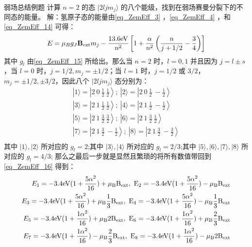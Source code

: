 \begin{example}{弱场总结例题}
计算 $n=2$ 的态 $|2ljm_j\rangle$ 的八个能级，找到在弱场赛曼分裂下的不同态的能量。
解：氢原子态的能量由\autoref{eq_ZemEff_3} ，\autoref{eq_ZemEff_4} ，和\autoref{eq_ZemEff_14} 可得：
\begin{equation}
E=\mu_Bg_J\mathbf{B}_{\rm{ext}}m_j-\frac{13.6\rm{eV}}{n^2}\left[1+\frac{\alpha}{n^2}\left(\frac{n}{j+1/2}-\frac{3}{4}\right)\right]
\end{equation}
其中 $g_l$ 由\autoref{eq_ZemEff_15} 所给出。那么当 $n=2$ 时，$l=0,1$ 并且因为 $j=l\pm s$，当 $l=0$ 时，$j=1/2,m_j=\pm 1/2$；当 $l=1$ 时，$j=1/2$ 或 $3/2$，$m_j=\pm 1/2,\pm 3/2$，因此八个 $|2ljm_j\rangle$ 态分别为：
\begin{align}
|1\rangle =\left|2 \ 0 \ \frac{1}{2} \ \frac{1}{2}\right\rangle;\ 
|2\rangle =\left|2 \ 0 \ \frac{1}{2} \ -\frac{1}{2}\right\rangle\\
|3\rangle =\left|2 \ 1 \ \frac{1}{2} \ \frac{1}{2}\right\rangle;\ 
|4\rangle =\left|2 \ 1 \ \frac{1}{2} \ -\frac{1}{2}\right\rangle\\
|5\rangle =\left|2 \ 1 \ \frac{3}{2} \ \frac{3}{2}\right\rangle;\ 
|6\rangle =\left|2 \ 1 \ \frac{3}{2} \ \frac{1}{2}\right\rangle\\
|7\rangle =\left|2 \ 1 \ \frac{3}{2} \ -\frac{1}{2}\right\rangle;\ 
|8\rangle =\left|2 \ 1 \ \frac{3}{2} \ -\frac{3}{2}\right\rangle\\
\end{align}
其中 $|1\rangle,|2\rangle$ 所对应的 $g_l=2$;其中 $|3\rangle,|4\rangle$ 所对应的 $g_l=2/3$;其中 $|5\rangle,|6\rangle,|7\rangle,|8\rangle$ 所对应的 $g_l=4/3$;
那么之最后一步就是显然且繁琐的将所有数值带回到\autoref{eq_ZemEff_16} 得到：
\begin{align}
E_1=-3.4\rm{eV}(1+\frac{5\alpha^2}{16})+\mu_BB_{\rm{ext}},\ 
E_2=-3.4\rm{eV}(1+\frac{5\alpha^2}{16})-\mu_BB_{\rm{ext}}\\
E_3=-3.4\rm{eV}(1+\frac{5\alpha^2}{16})+\mu_B\frac{1}{3}B_{\rm{ext}},\ 
E_4=-3.4\rm{eV}(1+\frac{5\alpha^2}{16})-\mu_B\frac{1}{3}B_{\rm{ext}}\\
E_5=-3.4\rm{eV}(1+\frac{1\alpha^2}{16})+\mu_B2B_{\rm{ext}},\ 
E_6=-3.4\rm{eV}(1+\frac{1\alpha^2}{16})+\mu_B\frac{2}{3}B_{\rm{ext}}\\
E_7=-3.4\rm{eV}(1+\frac{1\alpha^2}{16})-\mu_B\frac{2}{3}B_{\rm{ext}},\ 
E_8=-3.4\rm{eV}(1+\frac{1\alpha^2}{16})-\mu_B2B_{\rm{ext}}
\end{align}

\end{example}
